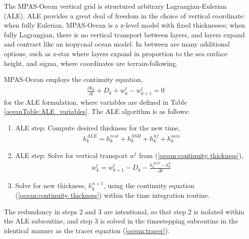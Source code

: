 The MPAS-Ocean vertical grid is structured arbitrary Lagrangian-Eulerian (ALE).   ALE provides a great deal of freedom in the choice of vertical coordinate: when fully Eulerian, MPAS-Ocean is a z-level model with fixed thicknesses; when fully Lagrangian, there is no vertical transport between layers, and layers expand and contract like an isopycnal ocean model.  In between are many additional options, such as z-star where layers expand in proportion to the sea surface height, and sigma, where coordinates are terrain-following.

MPAS-Ocean employs the continuity equation,
\begin{eqnarray}
\label{ocean:continuity thickness}
\frac{\partial h_{k}}{\partial t} + D_k + w^t_k - w^t_{k+1} =0
\end{eqnarray}
for the ALE formulation, where variables are defined in Table \ref{oceanTable:ALE_variables}.  The ALE algorithm is as follows:
\begin{enumerate}
\item ALE step: Compute desired thickness for the new time,
\begin{eqnarray}
\label{ocean:desired thickness}
h_k^{ALE} = h_k^{rest} + h_k^{SSH} + h_k^{hf} + h_k^{min}
\end{eqnarray}
\item ALE step: Solve for vertical transport $w^t$ from (\ref{ocean:continuity thickness}),
\begin{eqnarray}
\label{ocean:vert tranport}
w^t_k = w^t_{k+1} - D_k - \frac{h^{ALE}_k - h^n_k}{\Delta t}
\end{eqnarray}
\item Solve for new thickness, $h_{k}^{n+1}$, using the continuity equation (\ref{ocean:continuity thickness}) within the time integration routine.
\end{enumerate}
The redundancy in steps 2 and 3 are intentional, so that step 2 is isolated within the ALE subroutine, and step 3 is solved in the timestepping subroutine in the identical manner as the tracer equation (\ref{ocean:tracer}).

